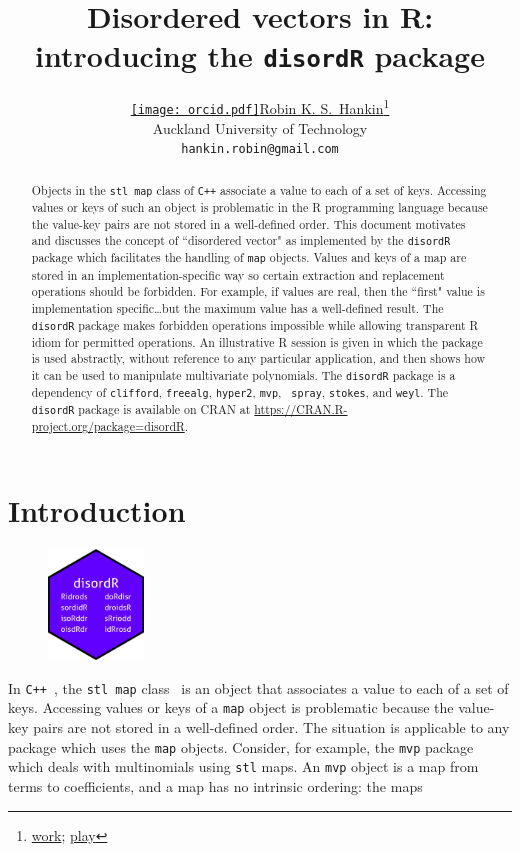 \documentclass{article}
\title{Disordered vectors in R: introducing the {\tt disordR} package}
\author{ \href{https://orcid.org/0000-0001-5982-0415}{\texttt{[image: orcid.pdf]}\hspace{1mm}Robin K. S.~Hankin}\thanks{\href{https://academics.aut.ac.nz/robin.hankin}{work};  
\href{https://www.youtube.com/watch?v=JzCX3FqDIOc&list=PL9_n3Tqzq9iWtgD8POJFdnVUCZ_zw6OiB&ab_channel=TrinTragulaGeneralRelativity}{play}} \\
 Auckland University of Technology\\
	\texttt{hankin.robin@gmail.com} \\
}
\begin{document}
\maketitle

\begin{abstract}

Objects in the {\tt stl map} class of {\tt C++} associate a value to
each of a set of keys.  Accessing values or keys of such an object is
problematic in the R programming language because the value-key pairs
are not stored in a well-defined order.  This document motivates and
discusses the concept of ``disordered vector" as implemented by the
{\tt disordR} package which facilitates the handling of {\tt map}
objects.  Values and keys of a map are stored in an
implementation-specific way so certain extraction and replacement
operations should be forbidden.  For example, if values are real, then
the ``first" value is implementation specific\ldots but the maximum
value has a well-defined result.  The {\tt disordR} package makes
forbidden operations impossible while allowing transparent R idiom for
permitted operations.  An illustrative R session is given in which the
package is used abstractly, without reference to any particular
application, and then shows how it can be used to manipulate
multivariate polynomials.  The {\tt disordR} package is a dependency
of {\tt clifford}, {\tt freealg}, {\tt hyper2}, {\tt mvp}, {\tt
  spray}, {\tt stokes}, and {\tt weyl}.  The {\tt disordR} package is
available on CRAN at \url{https://CRAN.R-project.org/package=disordR}.
\end{abstract}


\section{Introduction}

\setlength{\intextsep}{0pt}
\begin{figure}
  \begin{center}
\includegraphics[width=1in]{disordR.png}
  \end{center}
\end{figure}
In {\tt C++}~\cite{ISO14882}, the {\tt stl map}
class~\cite{josuttis1999} is an object that associates a value to each
of a set of keys.  Accessing values or keys of a {\tt map} object is
problematic because the value-key pairs are not stored in a
well-defined order.  The situation is applicable to any package which
uses the {\tt map} objects.  Consider, for example, the {\tt mvp}
package~\citep{hankin2022mvp} which deals with multinomials using
{\tt stl} maps.  An {\tt mvp} object is a map from terms to
coefficients, and a map has no intrinsic ordering: the maps
\end{document}
